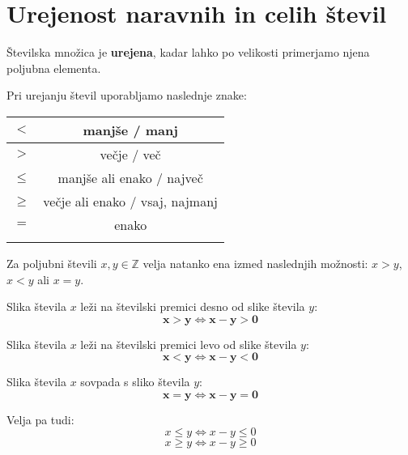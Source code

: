                     
\newpage
\section{Urejenost naravnih in celih števil}


    
        Številska množica je \textbf{urejena}, kadar lahko po velikosti primerjamo njena poljubna elementa.
    

    
        Pri urejanju števil uporabljamo naslednje znake:
        \begin{table}[H]
            \centering
            \addtolength{\tabcolsep}{6pt}
            \renewcommand{\arraystretch}{1.4}                
            \begin{tabular}{||c|c||} 
                \hhline{|t:==:t|}
                        $\mathbf{<}$ & manjše / manj  \\ 
                \hline
                        $\mathbf{>}$ & večje / več   \\ 
                \hline
                        $\mathbf{\leq}$ & manjše ali enako / največ   \\ 
                \hline
                        $\mathbf{\geq}$ & večje ali enako / vsaj, najmanj \\  
                \hline
                        $\mathbf{=}$ & enako \\
                \hhline{|b:==:b|}
            \end{tabular}
        \end{table}
    



    
        Za poljubni števili $x,y\in\mathbb{Z}$ velja natanko ena izmed naslednjih možnosti: $x>y$, $x<y$ ali $x=y$.
    \newline

            Slika števila $x$ leži na številski premici desno od slike števila $y$:
        $$\mathbf{x>y \Leftrightarrow x-y>0}$$
    

            Slika števila $x$ leži na številski premici levo od slike števila $y$:
        $$\mathbf{x<y \Leftrightarrow x-y<0}$$
    

            Slika števila $x$ sovpada s sliko števila $y$:
        $$\mathbf{x=y \Leftrightarrow x-y=0}$$
    \newline

    
        Velja pa tudi:
        $$x\leq y \Leftrightarrow x-y\leq 0 $$
        $$x\geq y \Leftrightarrow x-y\geq 0 $$


